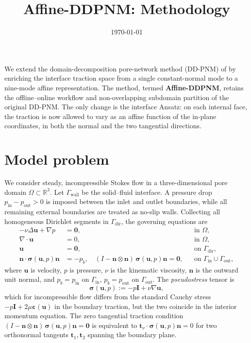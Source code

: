 \documentclass[11pt,a4paper]{article}
\newcommand{\R}{\mathbb{R}}
\newcommand{\dom}{\Omega}
\newcommand{\vel}{\bm{u}}
\newcommand{\pres}{p}
\newcommand{\stress}{\bm{\sigma}}
\newcommand{\normal}{\bm{n}}
\begin{document}
\title{\textbf{Affine-DDPNM: Methodology}}
\author{}
\date{\today}
\maketitle

We extend the domain-decomposition pore-network method (DD-PNM) of
\cite{sun2025ddpnm} by enriching the interface traction space from a single
constant-normal mode to a nine-mode affine representation.  The method,
termed \textbf{Affine-DDPNM}, retains the offline--online workflow and
non-overlapping subdomain partition of the original DD-PNM.  The only
change is the interface Ansatz: on each internal face, the traction is
now allowed to vary as an affine function of the in-plane coordinates, in
both the normal and the two tangential directions.

\section{Model problem}

We consider steady, incompressible Stokes flow in a three-dimensional
pore domain $\dom \subset \R^3$.  Let $\Gamma_{\text{wall}}$ be the
solid--fluid interface.  A pressure drop $p_{\text{in}} - p_{\text{out}}
> 0$ is imposed between the inlet and outlet boundaries, while all
remaining external boundaries are treated as no-slip walls.  Collecting
all homogeneous Dirichlet segments in $\Gamma_{\text{dir}}$, the governing
equations are
\begin{align}
  -\nu\Delta\vel + \nabla\pres &= \bm{0},                && \text{in } \dom,\\
  \nabla\cdot\vel &= 0,                                    && \text{in } \dom,\\
  \vel &= \bm{0},                                          && \text{on } \Gamma_{\text{dir}},\\
  \normal\cdot\stress(\vel,\pres)\normal &= -p_b,\quad
    (I - \normal\otimes\normal)\,\stress(\vel,\pres)\normal = \bm{0},
                                                          && \text{on } \Gamma_{\text{in}}\cup\Gamma_{\text{out}},
\end{align}
where $\vel$ is velocity, $\pres$ is pressure, $\nu$ is the kinematic
viscosity, $\normal$ is the outward unit normal, and $p_b = p_{\text{in}}$
on $\Gamma_{\text{in}}$, $p_b = p_{\text{out}}$ on $\Gamma_{\text{out}}$.
The \emph{pseudostress} tensor is
\[
  \stress(\vel,\pres) := -\pres\mathbf{I} + \nu\nabla\vel,
\]
which for incompressible flow differs from the standard Cauchy stress
$-\pres\mathbf{I} + 2\mu\bm{\varepsilon}(\vel)$ in the boundary traction,
but the two coincide in the interior momentum equation.
The zero tangential traction condition $(I - \normal\otimes\normal)\,
\stress(\vel,\pres)\normal = \bm{0}$ is equivalent to
$\bm{t}_{\nu}\cdot\stress(\vel,\pres)\normal = 0$ for two orthonormal
tangents $\bm{t}_1,\bm{t}_2$ spanning the boundary plane.
\end{document}
